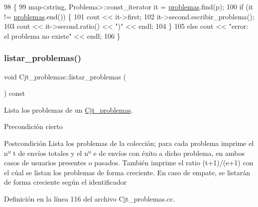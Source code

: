 \begin{DoxyCode}
98                                                                \{
99       map<string, Problema>::const\_iterator it = \mbox{\hyperlink{class_cjt__problemas_aad49222fb63517d7d7fc3d691f045cc5}{problemas}}.find(p);
100       \textcolor{keywordflow}{if} (it != \mbox{\hyperlink{class_cjt__problemas_aad49222fb63517d7d7fc3d691f045cc5}{problemas}}.end()) \{
101         cout << it->first;
102         it->second.escribir\_problema();
103         cout << it->second.ratio() << \textcolor{stringliteral}{")"} << endl;
104       \}
105       \textcolor{keywordflow}{else} cout << \textcolor{stringliteral}{"error: el problema no existe"} << endl;
106     \}
\end{DoxyCode}
\mbox{\label{class_cjt__problemas_a4cc09ed948f0315d5257d0d3a11e4dd5}} 
\subsubsection{\texorpdfstring{listar\+\_\+problemas()}{listar\_problemas()}}
{\footnotesize\ttfamily void Cjt\+\_\+problemas\+::listar\+\_\+problemas (\begin{DoxyParamCaption}{ }\end{DoxyParamCaption}) const}



Lista los problemas de un \mbox{\hyperlink{class_cjt__problemas}{Cjt\+\_\+problemas}}. 

\begin{DoxyPrecond}{Precondición}
cierto 
\end{DoxyPrecond}
\begin{DoxyPostcond}{Postcondición}
Lista los problemas de la colección; para cada problema imprime el nº t de envíos totales y el nº e de envíos con éxito a dicho problema, en ambos casos de usuarios presentes o pasados. También imprime el ratio (t+1)/(e+1) con el cúal se listan los problemas de forma creciente. En caso de empate, se listarán de forma creciente según el identificador 
\end{DoxyPostcond}


Definición en la línea 116 del archivo Cjt\+\_\+problemas.\+cc.


